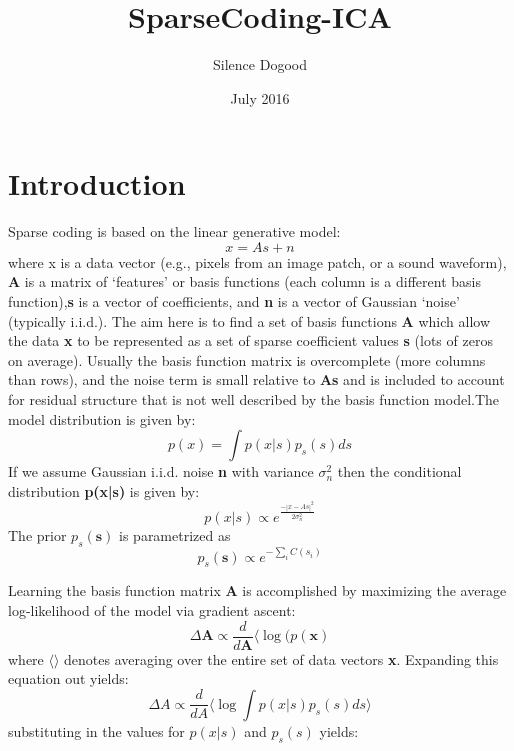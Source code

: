 \documentclass{article}
\title{SparseCoding-ICA}
\author{Silence Dogood }
\date{July 2016}
\begin{document}
\maketitle

\section{Introduction}
Sparse coding is based on the linear generative model:
\begin{equation}
    x = As + n
\end{equation}
where x is a data vector (e.g., pixels from an image patch, or a sound waveform), \textbf{A} is a matrix of ‘features’ or basis functions (each column is a different basis function),\textbf{s} is a vector of coefficients, and \textbf{n} is a vector of Gaussian ‘noise’ (typically i.i.d.). The aim here is to find a set of basis functions \textbf{A} which allow the data \textbf{x} to be represented as a set of sparse coefficient values \textbf{s} (lots of zeros on average). Usually the basis function matrix is overcomplete (more columns than rows), and the noise term is small relative to \textbf{As} and is included to account for residual structure that is not well described by the basis function model.The model distribution is given by:
\begin{equation}
    p(x) = \int{p(x|s)p_s(s) ds}
\end{equation}
If we assume Gaussian i.i.d. noise \textbf{n} with variance \textbf{$\sigma_n^2$} then the conditional distribution \textbf{p(x|s)} is given by:
\begin{equation}
    p(x|s) \propto e^{\frac{-|x - As|^2}{2\sigma_n^2}}
\end{equation}
The prior $p_s(\textbf{s})$ is parametrized as
\begin{equation}
    p_s(\textbf{s}) \propto e^{-\sum_i C(s_i)}
\end{equation}
\par Learning the basis function matrix \textbf{A} is accomplished by maximizing the average log-likelihood of the model via gradient ascent:
\begin{equation}
    \Delta\textbf{A} \propto \frac{d}{d\textbf{A}}\langle \log(p(\textbf{x})
\end{equation}
where $\langle\rangle$ denotes averaging over the entire set of data vectors \textbf{x}. Expanding this equation out yields:
\begin{equation}
    \Delta A \propto \frac{d}{dA} \langle \log\int p(x|s)p_s(s) ds \rangle
\end{equation}
substituting in the values for $p(x|s)$ and $p_s(s)$ yields:
\end{document}
